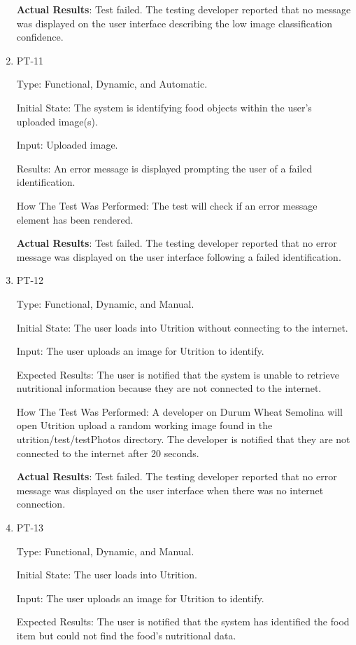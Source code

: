 \documentclass[12pt, titlepage]{article}
\begin{document}
\begin{enumerate}
		\textbf{Actual Results}: Test failed. The testing developer reported that no message was displayed on the user interface describing the low image classification confidence.
		
		\item{PT-11}
		
		Type: Functional, Dynamic, and Automatic.
		
		Initial State: The system is identifying food objects within the user's 
		uploaded image(s).
		
		Input: Uploaded image.
		
		Results: An error message is displayed prompting the user of a failed 
		identification.
		
		How The Test Was Performed: The test will check if an error message element has been rendered.
		
		\textbf{Actual Results}: Test failed. The testing developer reported that no error message was displayed on the user interface following a failed identification.
		
		\item{PT-12}
		
		Type: Functional, Dynamic, and Manual.
		
		Initial State: The user loads into Utrition without connecting to the internet.
		
		Input: The user uploads an image for Utrition to identify.
		
		Expected Results: The user is notified that the system is unable to retrieve nutritional information because they are not connected to the internet.
		
		How The Test Was Performed: A developer on Durum Wheat Semolina will open Utrition upload a random working image found in the utrition/test/testPhotos directory. The developer is notified that they are not connected to the internet after 20 seconds.
		
		\textbf{Actual Results}: Test failed. The testing developer reported that no error message was displayed on the user interface when there was no internet connection. 
		
		\item{PT-13} 
		
		Type: Functional, Dynamic, and Manual.
		
		Initial State: The user loads into Utrition.
		
		Input: The user uploads an image for Utrition to identify.
		
		Expected Results: The user is notified that the system has identified the food item but could not find the food’s nutritional data.
		

\end{enumerate}
\end{document}
